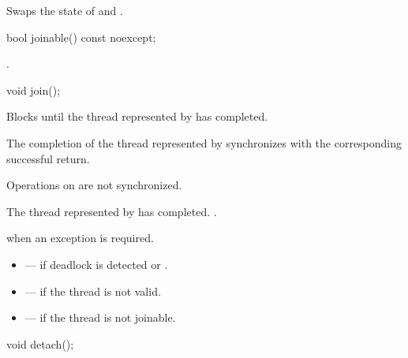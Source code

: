 \begin{itemdescr}
\pnum
\effects
Swaps the state of  and .
\end{itemdescr}

%
\begin{itemdecl}
bool joinable() const noexcept;
\end{itemdecl}

\begin{itemdescr}
\pnum
\returns
{}.
\end{itemdescr}

%
\begin{itemdecl}
void join();
\end{itemdecl}

\begin{itemdescr}
\pnum
{}%
\effects
Blocks until the thread represented by  has completed.

\pnum
\sync
The completion of the thread represented by  synchronizes with
the corresponding successful
 return.
\begin{note}
Operations on
 are not synchronized.
\end{note}

\pnum
\ensures
The thread represented by  has completed. .

\pnum
\throws
{} when
an exception is required.

\pnum
\errors
\begin{itemize}
\item {} --- if deadlock is detected or
.

\item {} --- if the thread is not valid.

\item {} --- if the thread is not joinable.
\end{itemize}
\end{itemdescr}

%
\begin{itemdecl}
void detach();
\end{itemdecl}

